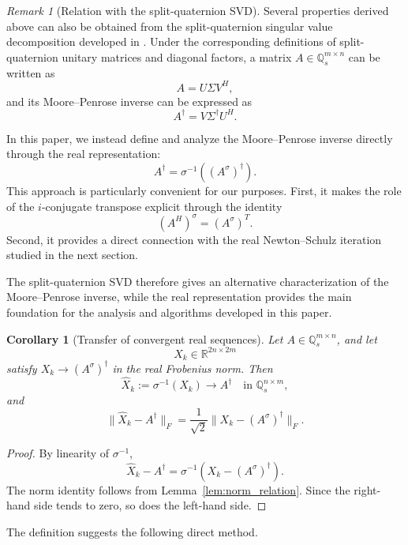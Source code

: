 \documentclass[12pt,a4paper]{article}
\theoremstyle{plain}
\newtheorem{corollary}[theorem]{Corollary}
\theoremstyle{definition}
\theoremstyle{remark}
\newtheorem{remark}[theorem]{Remark}
\begin{document}
\begin{remark}[Relation with the split-quaternion SVD]
Several properties derived above can also be obtained from the split-quaternion singular value decomposition developed in \cite{wang2024singular}. Under the corresponding definitions of split-quaternion unitary matrices and diagonal factors, a matrix \(A \in \mathbb{Q}_s^{m \times n}\) can be written as
\[
    A = U \Sigma V^H,
\]
and its Moore--Penrose inverse can be expressed as
\[
    A^\dagger = V \Sigma^\dagger U^H.
\]

In this paper, we instead define and analyze the Moore--Penrose inverse directly through the real representation:
\[
    A^\dagger = \sigma^{-1}\left((A^\sigma)^\dagger\right).
\]
This approach is particularly convenient for our purposes. First, it makes the role of the \(i\)-conjugate transpose explicit through the identity
\[
    (A^H)^\sigma = (A^\sigma)^T.
\]
Second, it provides a direct connection with the real Newton--Schulz iteration studied in the next section.

The split-quaternion SVD therefore gives an alternative characterization of the Moore--Penrose inverse, while the real representation provides the main foundation for the analysis and algorithms developed in this paper.
\end{remark}

\begin{corollary}[Transfer of convergent real sequences]
\label{cor_2}
Let \(A\in\mathbb{Q}_s^{m\times n}\), and let
\[
    X_k\in\mathbb{R}^{2n\times2m}
\]
satisfy \(X_k\to(A^\sigma)^\dagger\) in the real Frobenius norm. Then
\[
    \widehat X_k:=\sigma^{-1}(X_k)
    \longrightarrow A^\dagger
    \quad\text{in }\mathbb{Q}_s^{n\times m},
\]
and
\begin{equation} \label{eq:transfer_norm}
    \|\widehat X_k-A^\dagger\|_F =\frac{1}{\sqrt2}\|X_k-(A^\sigma)^\dagger\|_F.
\end{equation}
\end{corollary}

\begin{proof}
By linearity of \(\sigma^{-1}\),
\[
    \widehat X_k-A^\dagger =\sigma^{-1}\!\left(X_k-(A^\sigma)^\dagger\right).
\]
The norm identity follows from Lemma~\ref{lem:norm_relation}. Since the right-hand side tends to zero, so does the left-hand side.
\end{proof}

The definition suggests the following direct method.
\end{document}
